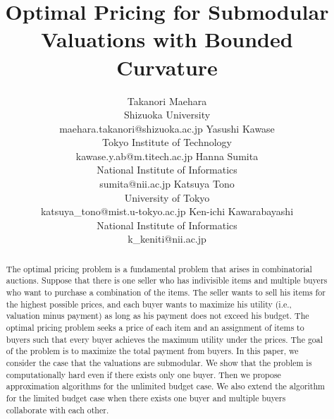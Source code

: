 \documentclass[letterpaper]{article}
\theoremstyle{definition}
\begin{document}
\title{Optimal Pricing for Submodular Valuations with Bounded Curvature}
\author{
Takanori Maehara\\
Shizuoka University \\
maehara.takanori@shizuoka.ac.jp
\And
Yasushi Kawase \\
Tokyo Institute of Technology \\
kawase.y.ab@m.titech.ac.jp
\AND
Hanna Sumita \\
National Institute of Informatics \\
sumita@nii.ac.jp
\And
Katsuya Tono \\
University of Tokyo \\
katsuya\_tono@mist.u-tokyo.ac.jp
\And
Ken-ichi Kawarabayashi \\
National Institute of Informatics \\
k\_keniti@nii.ac.jp
}
\nocopyright
\maketitle

\begin{abstract}
The optimal pricing problem is a fundamental problem that arises in combinatorial auctions.
Suppose that there is one seller who has indivisible items and multiple buyers who want to purchase a combination of the items.
The seller wants to sell his items for the highest possible prices,
and each buyer wants to maximize his utility (i.e., valuation minus payment) as long as his payment does not exceed his budget.
The optimal pricing problem seeks a price of each item and an assignment of items to buyers such that every buyer achieves the maximum utility under the prices.
The goal of the problem is to maximize the total payment from buyers.
In this paper, we consider the case that the valuations are submodular.
We show that the problem is computationally hard even if there exists only one buyer.
Then we propose approximation algorithms for the unlimited budget case.
We also extend the algorithm for the limited budget case when there exists one buyer and multiple buyers collaborate with each other.
\end{abstract}
\end{document}
